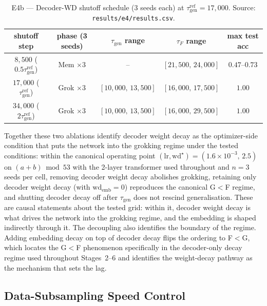 \documentclass{article}
\newcommand{\taug}{\tau_{\mathrm{gen}}}
\newcommand{\tauf}{\tau_{F}}
\begin{document}
\begin{table}[tbp]
  \centering
  \caption{E4b --- Decoder-WD shutoff schedule (3 seeds each) at
    $\taug^{\mathrm{ref}}{=}17{,}000$.
    Source: \texttt{results/e4/results.csv}.}
  \label{tab:e4_schedule}
  \small
  \begin{tabular}{ccccc}
    \toprule
    shutoff step & phase (3 seeds) & $\taug$ range & $\tauf$ range & max test acc \\
    \midrule
    $8{,}500$ ($0.5\taug^{\mathrm{ref}}$)  & Mem $\times 3$  & --                      & $[21{,}500,\,24{,}000]$ & $0.47$--$0.73$ \\
    $17{,}000$ ($\taug^{\mathrm{ref}}$)    & Grok $\times 3$ & $[10{,}000,\,13{,}500]$ & $[16{,}000,\,17{,}500]$ & $1.00$ \\
    $34{,}000$ ($2\taug^{\mathrm{ref}}$)   & Grok $\times 3$ & $[10{,}000,\,13{,}500]$ & $[16{,}000,\,29{,}500]$ & $1.00$ \\
    \bottomrule
  \end{tabular}
\end{table}

Together these two ablations identify decoder weight decay as the
optimizer-side condition that puts the network into the grokking
regime under the tested conditions: within the canonical
operating point
$(\mathrm{lr},\mathrm{wd}^{\star}){=}(1.6{\times}10^{-3},\,2.5)$
on $(a+b)\bmod 53$ with the 2-layer transformer used throughout
and $n{=}3$ seeds per cell, removing decoder weight decay
abolishes grokking, retaining only decoder weight decay (with
$\mathrm{wd}_{\mathrm{emb}}{=}0$) reproduces the canonical
G$<$F regime, and shutting decoder decay off after $\taug$
does not rescind generalisation.
These are causal statements about the tested grid: within it,
decoder weight decay is what drives the network into the grokking
regime, and the embedding is shaped indirectly through it.
The decoupling also identifies the boundary of the regime.
Adding embedding decay on top of decoder decay flips the ordering
to F$<$G, which locates the G$<$F phenomenon specifically in the
decoder-only decay regime used throughout Stages~2--6 and
identifies the weight-decay pathway as the mechanism that sets
the lag.

\subsection{Data-Subsampling Speed Control}
\label{sec:e5_subsample}
\end{document}
